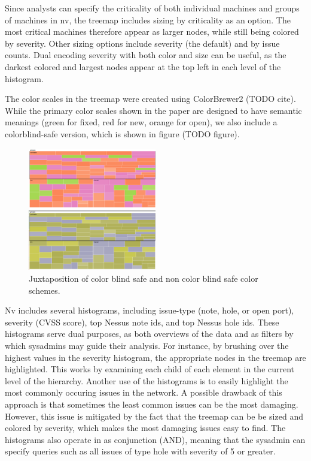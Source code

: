 \documentclass{acm_proc_article-sp}
\begin{document}
Since analysts can specify the criticality of both individual machines and groups of machines in nv, the treemap includes sizing by criticality as an option.
The most critical machines therefore appear as larger nodes, while still being colored by severity.
Other sizing options include severity (the default) and by issue counts.
Dual encoding severity with both color and size can be useful, as the darkest colored and largest nodes appear at the top left in each level of the histogram.

The color scales in the treemap were created using ColorBrewer2 (TODO cite).
While the primary color scales shown in the paper are designed to have semantic meanings (green for fixed, red for new, orange for open), we also include a colorblind-safe version, which is shown in figure (TODO figure).


\begin{figure}
  \label{CBFig}
  \centering
  \includegraphics[width=0.5\textwidth]{../screenshots/cb_version_both}
  \caption{Juxtaposition of color blind safe and non color blind safe color schemes.}
\end{figure}

Nv includes several histograms, including issue-type (note, hole, or open port), severity (CVSS score), top Nessus note ids, and top Nessus hole ids.
These histograms serve dual purposes, as both overviews of the data and as filters by which sysadmins may guide their analysis.
For instance, by brushing over the highest values in the severity histogram, the appropriate nodes in the treemap are highlighted.
This works by examining each child of each element in the current level of the hierarchy.
Another use of the histograms is to easily highlight the most commonly occuring issues in the network.
A possible drawback of this approach is that sometimes the least common issues can be the most damaging.
However, this issue is mitigated by the fact that the treemap can be be sized and colored by severity, which makes the most damaging issues easy to find.
The histograms also operate in as conjunction (AND), meaning that the sysadmin can specify queries such as all issues of type hole with severity of 5 or greater.
\end{document}
